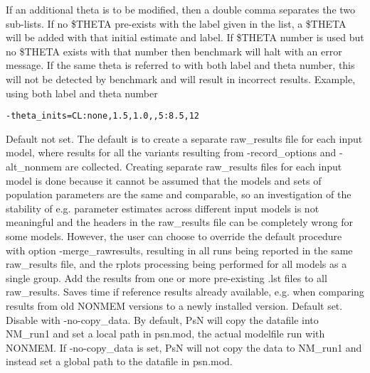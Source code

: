 \begin{optionlist}
If an additional theta is to be modified, then a double comma separates 
the two sub-lists. If no \$THETA pre-exists with the label given in the list,
a \$THETA will be added with that initial estimate and label. 
If \$THETA number is used but no \$THETA exists with that number then benchmark will halt with an
error message.
If the same theta is referred to with both label and theta number, this will not be detected
by benchmark and will result in incorrect results.
Example, using both label and theta number
\begin{verbatim}
-theta_inits=CL:none,1.5,1.0,,5:8.5,12
\end{verbatim}
\nextopt
{}
Default not set. The default is to create a separate raw\_results file for each input model,
where results for all the variants resulting from -record\_options and -alt\_nonmem
are collected. Creating separate raw\_results files for each input model is done because
it cannot be assumed that the models and sets of population parameters are the same and comparable,
so an investigation of the stability of e.g. parameter estimates across different input models
is not meaningful and the headers in the raw\_results file can be completely wrong for some models. 
However, the user can choose to override the default procedure
with option -merge\_rawresults, resulting in all runs being reported in the same raw\_results file,
and the rplots processing being performed for all models as a single group.
\nextopt
{}
Add the results from one or more pre-existing .lst files to all raw\_results.
Saves time if reference results already available, e.g. when comparing results
from old NONMEM versions to a newly installed version.
\nextopt
{}
Default set. Disable with -no-copy\_data. By default, PsN will copy the datafile into NM\_run1 and set a local path in psn.mod, the actual modelfile run with NONMEM. If -no-copy\_data is set, PsN will not copy the data to NM\_run1 and instead set a global path to the datafile in psn.mod.
\nextopt
\end{optionlist}

